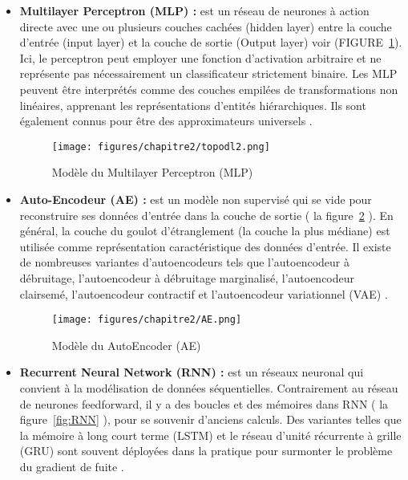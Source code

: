     \begin{itemize}
    \setlength{\itemsep}{5pt}

		\item \textbf{Multilayer Perceptron (MLP) :} est un réseau de neurones à action directe avec une ou plusieurs couches cachées (hidden layer) entre la couche d'entrée (input layer) et la couche de sortie (Output layer) voir (FIGURE~\ref{fig:MLP}). Ici, le perceptron peut employer une fonction d'activation arbitraire et ne représente pas nécessairement un classificateur strictement binaire. 
		Les MLP peuvent être interprétés comme des couches empilées de transformations non linéaires, apprenant les représentations d'entités hiérarchiques. Ils sont également connus pour être des approximateurs universels \cite{ch2ref4}.
		
		\begin{figure}[H]
        	\begin{center}
        		\texttt{[image: figures/chapitre2/topodl2.png]}
        	\end{center}
        	\caption {Modèle du Multilayer Perceptron (MLP) }
        	\label{fig:MLP}
        \end{figure}
		
		\item \textbf{Auto-Encodeur (AE) :}	est un modèle non supervisé qui se vide pour reconstruire ses données d'entrée dans la couche de sortie ( la figure~\ref{fig:AE} ). En général, la couche du goulot d'étranglement (la couche la plus médiane) est utilisée comme représentation caractéristique des données d'entrée. Il existe de nombreuses variantes d'autoencodeurs tels que l'autoencodeur à débruitage, l'autoencodeur à débruitage marginalisé, l'autoencodeur clairsemé, l'autoencodeur contractif et l'autoencodeur variationnel (VAE) \cite{ch2ref4}.

		\begin{figure}[H]
        	\begin{center}
        		\texttt{[image: figures/chapitre2/AE.png]}
        	\end{center}
        	\caption {Modèle du AutoEncoder (AE) \cite{ch2ref12}}
        	\label{fig:AE}
        \end{figure}

		\item \textbf{Recurrent Neural Network (RNN) :} est un réseaux neuronal qui convient à la modélisation de données séquentielles. Contrairement au réseau de neurones feedforward, il y a des boucles et des mémoires dans RNN ( la figure~\ref{fig:RNN} ), pour se souvenir d'anciens calculs. Des variantes telles que la mémoire à long court terme (LSTM) et le réseau d'unité récurrente à grille (GRU) sont souvent déployées dans la pratique pour surmonter le problème du gradient de fuite \cite{ch2ref4}.
		

\end{itemize}
